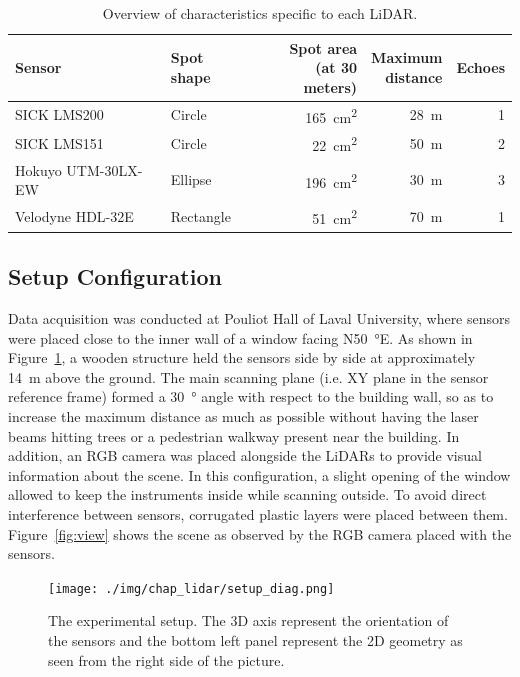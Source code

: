 \begin{table}[h]
    \centering
    \begin{tabular}{@{}llrrr@{}}
        \toprule
        \textbf{Sensor} & \textbf{Spot shape} & \makecell[rc]{\textbf{Spot area} \\ (at 30 meters)} & \makecell[rc]{\textbf{Maximum} \\ \textbf{distance}} & \textbf{Echoes} \\
        \hline
        SICK LMS200         & Circle    & \SI{165}{\centi\meter\squared} & \SI{28}{\meter} & 1 \\
        SICK LMS151         & Circle    & \SI{22}{\centi\meter\squared}  & \SI{50}{\meter} & 2 \\
        Hokuyo UTM-30LX-EW  & Ellipse   & \SI{196}{\centi\meter\squared} & \SI{30}{\meter} & 3 \\
        Velodyne HDL-32E    & Rectangle & \SI{51}{\centi\meter\squared}  & \SI{70}{\meter} & 1 \\
        \bottomrule
    \end{tabular}
    \caption{Overview of characteristics specific to each LiDAR.}
    \label{tab:lidars}
\end{table}

\subsection{Setup Configuration}

Data acquisition was conducted at Pouliot Hall of Laval University, where sensors were placed close to the inner wall of a window facing N\SI{50}{\degree}E. As shown in Figure~\ref{fig:setup}, a wooden structure held the sensors side by side at approximately \SI{14}{\meter} above the ground. The main scanning plane (i.e. XY plane in the sensor reference frame) formed a \SI{30}{\degree} angle with respect to the building wall, so as to increase the maximum distance as much as possible without having the laser beams hitting  trees or a pedestrian walkway present near the building. In addition, an RGB camera was placed alongside the LiDARs to provide visual information about the scene. In this configuration, a slight opening of the window allowed to keep the instruments inside while scanning outside. To avoid direct interference between sensors, corrugated plastic layers were placed between them. Figure~\ref{fig:view} shows the scene as observed by the RGB camera placed with the sensors.

\begin{figure}[h]
    \centering
    \texttt{[image: ./img/chap\_lidar/setup\_diag.png]}
    \caption{The experimental setup. The 3D axis represent the orientation of the sensors and the bottom left panel represent the 2D geometry as seen from the right side of the picture.}
    \label{fig:setup}
\end{figure}

